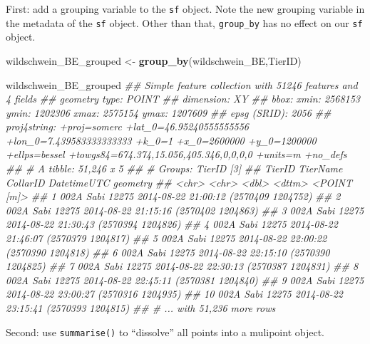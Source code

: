 \documentclass[]{book}
\newenvironment{Shaded}{\begin{snugshade}}{\end{snugshade}}
\newcommand{\CommentTok}[1]{\textcolor[rgb]{0.56,0.35,0.01}{\textit{#1}}}
\newcommand{\KeywordTok}[1]{\textcolor[rgb]{0.13,0.29,0.53}{\textbf{#1}}}
\newcommand{\NormalTok}[1]{#1}
\newcommand{\StringTok}[1]{\textcolor[rgb]{0.31,0.60,0.02}{#1}}
\begin{document}
First: add a grouping variable to the \texttt{sf} object. Note the new grouping variable in the metadata of the \texttt{sf} object. Other than that, \texttt{group\_by} has no effect on our \texttt{sf} object.

\begin{Shaded}
\begin{Highlighting}[]
\NormalTok{wildschwein_BE_grouped <-}\StringTok{ }\KeywordTok{group_by}\NormalTok{(wildschwein_BE,TierID)}

\NormalTok{wildschwein_BE_grouped}
\CommentTok{## Simple feature collection with 51246 features and 4 fields}
\CommentTok{## geometry type:  POINT}
\CommentTok{## dimension:      XY}
\CommentTok{## bbox:           xmin: 2568153 ymin: 1202306 xmax: 2575154 ymax: 1207609}
\CommentTok{## epsg (SRID):    2056}
\CommentTok{## proj4string:    +proj=somerc +lat_0=46.95240555555556 +lon_0=7.439583333333333 +k_0=1 +x_0=2600000 +y_0=1200000 +ellps=bessel +towgs84=674.374,15.056,405.346,0,0,0,0 +units=m +no_defs}
\CommentTok{## # A tibble: 51,246 x 5}
\CommentTok{## # Groups:   TierID [3]}
\CommentTok{##    TierID TierName CollarID DatetimeUTC                  geometry}
\CommentTok{##    <chr>  <chr>       <dbl> <dttm>                    <POINT [m]>}
\CommentTok{##  1 002A   Sabi        12275 2014-08-22 21:00:12 (2570409 1204752)}
\CommentTok{##  2 002A   Sabi        12275 2014-08-22 21:15:16 (2570402 1204863)}
\CommentTok{##  3 002A   Sabi        12275 2014-08-22 21:30:43 (2570394 1204826)}
\CommentTok{##  4 002A   Sabi        12275 2014-08-22 21:46:07 (2570379 1204817)}
\CommentTok{##  5 002A   Sabi        12275 2014-08-22 22:00:22 (2570390 1204818)}
\CommentTok{##  6 002A   Sabi        12275 2014-08-22 22:15:10 (2570390 1204825)}
\CommentTok{##  7 002A   Sabi        12275 2014-08-22 22:30:13 (2570387 1204831)}
\CommentTok{##  8 002A   Sabi        12275 2014-08-22 22:45:11 (2570381 1204840)}
\CommentTok{##  9 002A   Sabi        12275 2014-08-22 23:00:27 (2570316 1204935)}
\CommentTok{## 10 002A   Sabi        12275 2014-08-22 23:15:41 (2570393 1204815)}
\CommentTok{## # ... with 51,236 more rows}
\end{Highlighting}
\end{Shaded}

Second: use \texttt{summarise()} to ``dissolve'' all points into a mulipoint object.
\end{document}
